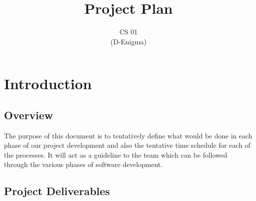 \documentclass[
10pt, %
a4paper, %
oneside, %
headinclude,footinclude, %
BCOR5mm, %
]{scrartcl}
\title{Project Plan} %
\author{CS 01 \\(D-Enigma)} %
\date{} %
\begin{document}





\maketitle %

\setcounter{tocdepth}{2} %

\tableofcontents %


\newpage

\section{Introduction}

\subsection{\textbf{Overview}}

The purpose of this document is to tentatively define what would be done in each phase of our project development and also the tentative time schedule for each of the processes. It will act as a guideline to the team which can be followed through the various phases of software development. 

\subsection{Project Deliverables}
\end{document}
